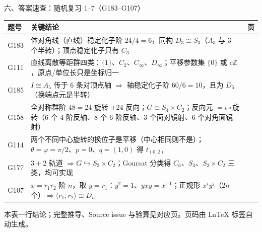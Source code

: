 \documentclass[aspectratio=169,10pt,fontset=none]{ctexbeamer}
\begin{document}
\begin{frame}[t]{六、答案速查：随机复习 1--7（G183--G107）}
  \label{sec:answers}
  \centering
  \scriptsize
  \setlength{\tabcolsep}{3pt}
  \renewcommand{\arraystretch}{1.16}
  \begin{tabular}{@{}l p{9.9cm} c@{}}
    \toprule
    题号 & 关键结论 & 页\\
    \midrule
    G183 & 体对角线（直线）稳定化子阶 $24/4=6$，同构 $D_3\cong S_3$（$A_3$ 与 $3$ 个半转）；顶点稳定化子只有 $C_3$ & \pageref{ex:G183}\\
    G111 & 直线离散等距群四类：$\{1\}$、$C_2$、$C_\infty$、$D_\infty$；平移参数集 $\{0\}$ 或 $c\mathbb Z$，原点/单位长只是坐标归一 & \pageref{ex:G111}\\
    G185 & $I\cong A_5$ 传于 $6$ 条对顶点轴 $\Rightarrow$ 轴稳定化子阶 $60/6=10$，且为 $D_5$（换端点元是半转） & \pageref{ex:G185}\\
    G158 & 全对称群阶 $48=24$ 旋转 $+24$ 反向；$G\cong S_4\times C_2$；反向元 $=\iota\circ$旋转（$6$ 个 $4$ 阶反轴、$8$ 个 $6$ 阶反轴、$3$ 个面对镜射、$6$ 个对角面镜射） & \pageref{ex:G158}\\
    G114 & 两个不同中心旋转的换位子是平移（中心相同则不是）；$\theta=\varphi=\pi/2$、$p=0$、$q=(1,0)$ 得 $t_{(0,2)}$ & \pageref{ex:G114}\\
    G177 & $3+2$ 轨道 $\Rightarrow G\hookrightarrow S_3\times C_2$；Goursat 分类得 $C_6$、$S_3$、$S_3\times C_2$ 三类，均可实现 & \pageref{ex:G177}\\
    G107 & $x=r_1r_2$ 阶 $n$，取 $y=r_1$：$y^2=1$、$yxy=x^{-1}$；正规形 $x^iy^j$（$2n$ 个）$\Rightarrow\langle r_1,r_2\rangle\cong D_n$ & \pageref{ex:G107}\\
    \bottomrule
  \end{tabular}
  \par
  \vspace{0.3em}
  {\scriptsize\color{ink!70} 本表一行结论；完整推导、Source issue 与验算见对应页。页码由 \LaTeX{} 标签自动生成。}
\end{frame}
\end{document}
